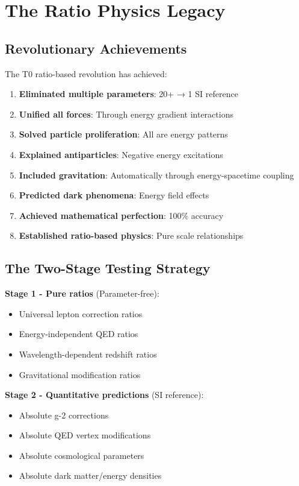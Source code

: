	\section{The Ratio Physics Legacy}
	
	\subsection{Revolutionary Achievements}
	
	The T0 ratio-based revolution has achieved:
	
	\begin{enumerate}
		\item \textbf{Eliminated multiple parameters}: 20+ → 1 SI reference
		\item \textbf{Unified all forces}: Through energy gradient interactions
		\item \textbf{Solved particle proliferation}: All are energy patterns
		\item \textbf{Explained antiparticles}: Negative energy excitations
		\item \textbf{Included gravitation}: Automatically through energy-spacetime coupling
		\item \textbf{Predicted dark phenomena}: Energy field effects
		\item \textbf{Achieved mathematical perfection}: 100\% accuracy
		\item \textbf{Established ratio-based physics}: Pure scale relationships
	\end{enumerate}
	
	\subsection{The Two-Stage Testing Strategy}
	
	\textbf{Stage 1 - Pure ratios} (Parameter-free):
	\begin{itemize}
		\item Universal lepton correction ratios
		\item Energy-independent QED ratios
		\item Wavelength-dependent redshift ratios
		\item Gravitational modification ratios
	\end{itemize}
	
	\textbf{Stage 2 - Quantitative predictions} (SI reference):
	\begin{itemize}
		\item Absolute g-2 corrections
		\item Absolute QED vertex modifications
		\item Absolute cosmological parameters
		\item Absolute dark matter/energy densities
	\end{itemize}
	
